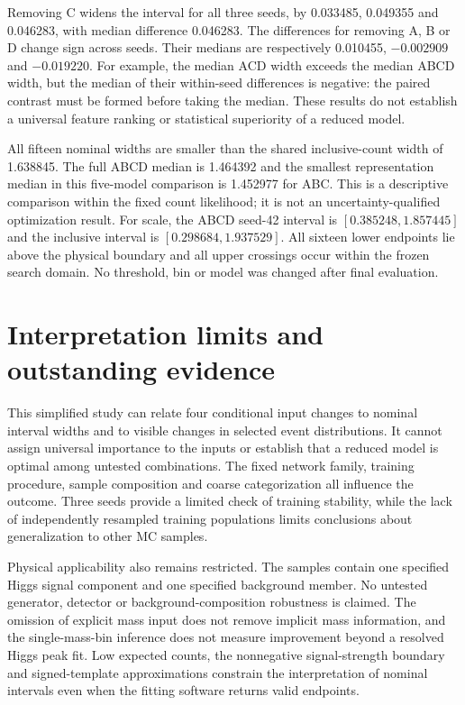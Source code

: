 \documentclass[aps,prd,reprint,superscriptaddress,nofootinbib,longbibliography,floatfix]{revtex4-2}
\begin{document}


Removing C widens the interval for all three seeds, by 0.033485, 0.049355 and
0.046283, with median difference 0.046283. The differences for removing A, B or D
change sign across seeds. Their medians are respectively 0.010455, $-0.002909$
and $-0.019220$. For example, the median ACD width exceeds the median ABCD width,
but the median of their within-seed differences is negative: the paired contrast
must be formed before taking the median. These results do not establish a
universal feature ranking or statistical superiority of a reduced model.

All fifteen nominal widths are smaller than the shared inclusive-count width
of 1.638845. The full ABCD median is 1.464392 and the smallest representation
median in this five-model comparison is 1.452977 for ABC. This is a descriptive
comparison within the fixed count likelihood; it is not an uncertainty-qualified
optimization result. For scale, the ABCD seed-42 interval is
$[0.385248,1.857445]$ and the inclusive interval is $[0.298684,1.937529]$.
All sixteen lower endpoints lie above the physical boundary and all upper
crossings occur within the frozen search domain. No threshold, bin or model was
changed after final evaluation.

\section{Interpretation limits and outstanding evidence}

This simplified study can relate four conditional input changes to nominal interval widths
and to visible changes in selected event distributions. It cannot assign universal
importance to the inputs or establish that a reduced model is optimal among untested
combinations. The fixed network family, training procedure, sample composition and coarse
categorization all influence the outcome. Three seeds provide a limited check of training
stability, while the lack of independently resampled training populations limits conclusions
about generalization to other MC samples.

Physical applicability also remains restricted. The samples contain one specified Higgs
signal component and one specified background member. No untested generator, detector or
background-composition robustness is claimed. The omission of explicit mass input does not
remove implicit mass information, and the single-mass-bin inference does not measure
improvement beyond a resolved Higgs peak fit. Low expected counts, the nonnegative
signal-strength boundary and signed-template approximations constrain the interpretation of
nominal intervals even when the fitting software returns valid endpoints.
\end{document}
